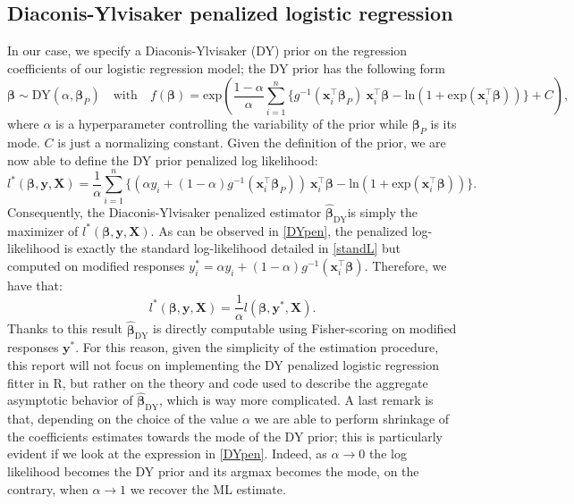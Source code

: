 \documentclass{article}
\begin{document}
\subsection{Diaconis-Ylvisaker penalized logistic regression}
In our case, we specify a Diaconis-Ylvisaker (DY) prior on the regression coefficients of our logistic regression model; the DY 
prior has the following form
\begin{equation*}
\boldsymbol{\beta}\sim\text{DY}(\alpha,\boldsymbol{\beta}_P)\quad\text{with}\quad f(\boldsymbol{\beta})=\text{exp}\left(\frac{1-\alpha}{\alpha}\overset{n}{\underset{i=1}\sum}\{g^{-1}(\mathbf{x}_i^\top \boldsymbol{\beta}_P)\ \mathbf{x}_i^\top\boldsymbol{\beta}-\text{ln}(1+\text{exp}(\mathbf{x}_i^\top\boldsymbol{\beta}))\}+C\right),
\end{equation*}
where $\alpha$ is a hyperparameter controlling the variability of the prior while $\boldsymbol{\beta}_P$ is its mode. $C$ is just a normalizing constant. Given the definition of the prior, we are now able to define the DY prior penalized log likelihood: 
\begin{equation}
l^*(\boldsymbol{\beta},\mathbf{y},\mathbf{X})=\frac{1}{\alpha}\overset{n}{\underset{i=1}\sum}\{(\alpha y_i+(1-\alpha)g^{-1}(\mathbf{x}_i^\top\boldsymbol{\beta}_P))\ \mathbf{x}_i^\top\boldsymbol{\beta}-\text{ln}(1+\text{exp}(\mathbf{x}_i^\top\boldsymbol{\beta}))\}.
\label{DYpen}
\end{equation}
Consequently, the Diaconis-Ylvisaker penalized estimator $\hat{\boldsymbol{\beta}}_{\text{DY}}$is simply the maximizer of
$l^*(\boldsymbol{\beta},\mathbf{y},\mathbf{X})$. As can be observed in \eqref{DYpen}, the penalized log-likelihood is exactly the standard log-likelihood detailed in \eqref{standL} but computed on modified responses $y_i^*=\alpha y_i+(1-\alpha)g^{-1}(\mathbf{x}_i^\top\boldsymbol{\beta})$. Therefore, we have that:
\begin{equation*}
l^*(\boldsymbol{\beta},\mathbf{y},\mathbf{X})=\frac{1}{\alpha}l(\boldsymbol{\beta},\mathbf{y}^*,\mathbf{X}).
\end{equation*}
Thanks to this result $\hat{\boldsymbol{\beta}}_{\text{DY}}$ is directly computable using Fisher-scoring on modified responses $\mathbf{y}^*$. For this reason, given the simplicity of the estimation procedure, this report will not focus on implementing the DY penalized logistic regression fitter in R, but rather on the theory and code used to describe the aggregate asymptotic behavior of $\hat{\boldsymbol{\beta}}_{\text{DY}}$, which is way more complicated. A last remark is that, depending on the choice of the value $\alpha$ we are able to perform shrinkage of the coefficients estimates towards the mode of the DY prior; this is particularly evident if we look at the expression in \eqref{DYpen}. Indeed, as $\alpha\rightarrow0$ the log likelihood becomes the DY prior and its argmax becomes the mode, on the contrary, when $\alpha\rightarrow1$ we recover the ML estimate. 
\end{document}
